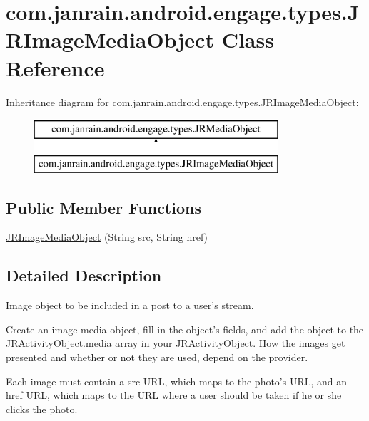 \hypertarget{classcom_1_1janrain_1_1android_1_1engage_1_1types_1_1_j_r_image_media_object}{
\section{com.janrain.android.engage.types.JRImageMediaObject Class Reference}
\label{classcom_1_1janrain_1_1android_1_1engage_1_1types_1_1_j_r_image_media_object}
}
Inheritance diagram for com.janrain.android.engage.types.JRImageMediaObject:\begin{figure}[H]
\begin{center}
\leavevmode
\includegraphics[height=2.000000cm]{classcom_1_1janrain_1_1android_1_1engage_1_1types_1_1_j_r_image_media_object}
\end{center}
\end{figure}
\subsection*{Public Member Functions}
\begin{DoxyCompactItemize}
\item 
\hyperlink{classcom_1_1janrain_1_1android_1_1engage_1_1types_1_1_j_r_image_media_object_a14ad49a8b8a77ef12ed459b685cbac07}{JRImageMediaObject} (String src, String href)
\end{DoxyCompactItemize}


\subsection{Detailed Description}
Image object to be included in a post to a user's stream.

Create an image media object, fill in the object's fields, and add the object to the JRActivityObject.media array in your \hyperlink{classcom_1_1janrain_1_1android_1_1engage_1_1types_1_1_j_r_activity_object}{JRActivityObject}. How the images get presented and whether or not they are used, depend on the provider.

Each image must contain a src URL, which maps to the photo's URL, and an href URL, which maps to the URL where a user should be taken if he or she clicks the photo.

